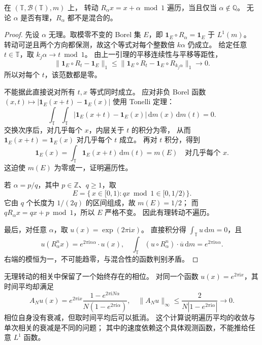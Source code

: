\begin{theorem}[圆周转动的遍历性]
\label{b1:thm:irrational-rotation-32}
在 \((\mathbb T,\mathcal B(\mathbb T),m)\) 上，
转动 \(R_\alpha x=x+\alpha\bmod1\) 遍历，当且仅当 \(\alpha\notin\mathbb Q\)。
无论 \(\alpha\) 是否有理，\(R_\alpha\) 都不是混合的。
\end{theorem}
\begin{proof}
先设 \(\alpha\) 无理。取模零不变的 Borel 集 \(E\)，即
\(\mathbf1_E\circ R_\alpha=\mathbf1_E\) 于 \(L^1(m)\)。
转动可逆且两个方向都保测，故这个等式对每个整数倍 \(k\alpha\) 仍成立。
给定任意 \(t\in\mathbb T\)，取 \(k_j\alpha\to t\bmod1\)。
由上一引理的平移连续性与平移等距性，
\[
 \|\mathbf1_E\circ R_t-\mathbf1_E\|_1
 \leq\|\mathbf1_E\circ R_t-\mathbf1_E\circ R_{k_j\alpha}\|_1
 \longrightarrow0.
\]
所以对每个 \(t\)，该范数都是零。

不能据此直接说对所有 \(t,x\) 等式同时成立。
应对非负 Borel 函数 \((x,t)\mapsto|\mathbf1_E(x+t)-\mathbf1_E(x)|\)
使用 Tonelli 定理：
\[
 \int_{\mathbb T}\int_{\mathbb T}
 |\mathbf1_E(x+t)-\mathbf1_E(x)|\,\mathrm dm(x)\,\mathrm dm(t)=0.
\]
交换次序后，对几乎每个 \(x\)，内层关于 \(t\) 的积分为零，
从而 \(\mathbf1_E(x+t)=\mathbf1_E(x)\) 对几乎每个 \(t\) 成立。
再对 \(t\) 积分，得到
\[
 \mathbf1_E(x)=\int_{\mathbb T}\mathbf1_E(x+t)\,\mathrm dm(t)=m(E)
 \quad\text{对几乎每个 }x.
\]
这迫使 \(m(E)\) 为零或一，证明遍历性。

若 \(\alpha=p/q\)，其中 \(p\in\mathbb Z\)、\(q\geq1\)，取
\[
 E=\{\,x\in[0,1):qx\bmod1\in[0,1/2)\,\}.
\]
它由 \(q\) 个长度为 \(1/(2q)\) 的区间组成，故 \(m(E)=1/2\)；
而 \(qR_\alpha x=qx+p\bmod1\)，所以 \(E\) 严格不变。
因此有理转动不遍历。

最后，对任意 \(\alpha\)，取 \(u(x)=\exp(2\pi\mathrm ix)\)。
直接积分得 \(\int_{\mathbb T}u\,\mathrm dm=0\)，且
\[
 u(R_\alpha^nx)=e^{2\pi\mathrm in\alpha}\cdot u(x),\quad
 \int_{\mathbb T}(u\circ R_\alpha^n)\cdot\overline u\,\mathrm dm
 =e^{2\pi\mathrm in\alpha}.
\]
右端的模恒为一，不可能趋零，与混合性的函数判别矛盾。
\end{proof}

无理转动的相关中保留了一个始终存在的相位。
对同一个函数 \(u(x)=e^{2\pi\mathrm ix}\)，其时间平均却满足
\[
 A_Nu(x)=e^{2\pi\mathrm ix}
 \frac{1-e^{2\pi\mathrm iN\alpha}}{N(1-e^{2\pi\mathrm i\alpha})},
 \quad
 \|A_Nu\|_\infty\leq\frac2{N|1-e^{2\pi\mathrm i\alpha}|}
 \longrightarrow0.
\]
相位自身没有衰减，但取时间平均后可以抵消。
这个计算说明遍历平均的收敛与单次相关的衰减是不同的问题；
其中的速度依赖这个具体观测函数，不能推给任意 \(L^1\) 函数。

